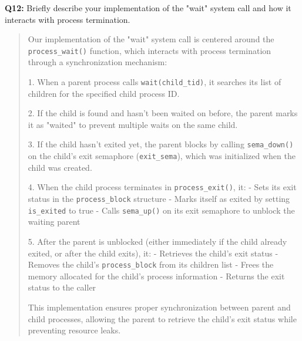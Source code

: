 \documentclass[a4paper,11pt]{paper}
\begin{document}
\newpage
\textbf{Q12:} Briefly describe your implementation of the "wait" system call and how it interacts with process termination.
\begin{quote}
Our implementation of the "wait" system call is centered around the \texttt{process\_wait()} function, which interacts with process termination through a synchronization mechanism:

1. When a parent process calls \texttt{wait(child\_tid)}, it searches its list of children for the specified child process ID.

2. If the child is found and hasn't been waited on before, the parent marks it as "waited" to prevent multiple waits on the same child.

3. If the child hasn't exited yet, the parent blocks by calling \texttt{sema\_down()} on the child's exit semaphore (\texttt{exit\_sema}), which was initialized when the child was created.

4. When the child process terminates in \texttt{process\_exit()}, it:
   - Sets its exit status in the \texttt{process\_block} structure
   - Marks itself as exited by setting \texttt{is\_exited} to true
   - Calls \texttt{sema\_up()} on its exit semaphore to unblock the waiting parent

5. After the parent is unblocked (either immediately if the child already exited, or after the child exits), it:
   - Retrieves the child's exit status
   - Removes the child's \texttt{process\_block} from its children list
   - Frees the memory allocated for the child's process information
   - Returns the exit status to the caller

This implementation ensures proper synchronization between parent and child processes, allowing the parent to retrieve the child's exit status while preventing resource leaks.
\end{quote}
\end{document}
